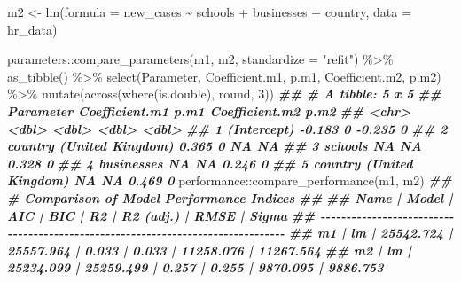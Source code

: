 \documentclass[
]{book}
\newenvironment{Shaded}{\begin{snugshade}}{\end{snugshade}}
\newcommand{\AttributeTok}[1]{\textcolor[rgb]{0.77,0.63,0.00}{#1}}
\newcommand{\DecValTok}[1]{\textcolor[rgb]{0.00,0.00,0.81}{#1}}
\newcommand{\DocumentationTok}[1]{\textcolor[rgb]{0.56,0.35,0.01}{\textbf{\textit{#1}}}}
\newcommand{\FunctionTok}[1]{\textcolor[rgb]{0.00,0.00,0.00}{#1}}
\newcommand{\NormalTok}[1]{#1}
\newcommand{\OtherTok}[1]{\textcolor[rgb]{0.56,0.35,0.01}{#1}}
\newcommand{\SpecialCharTok}[1]{\textcolor[rgb]{0.00,0.00,0.00}{#1}}
\newcommand{\StringTok}[1]{\textcolor[rgb]{0.31,0.60,0.02}{#1}}
\begin{document}
\begin{Shaded}
\begin{Highlighting}[]
\NormalTok{m2 }\OtherTok{\textless{}{-}} \FunctionTok{lm}\NormalTok{(}\AttributeTok{formula =}\NormalTok{ new\_cases }\SpecialCharTok{\textasciitilde{}}
\NormalTok{           schools }\SpecialCharTok{+}
\NormalTok{           businesses }\SpecialCharTok{+}
\NormalTok{           country,}
         \AttributeTok{data =}\NormalTok{ hr\_data)}

\NormalTok{parameters}\SpecialCharTok{::}\FunctionTok{compare\_parameters}\NormalTok{(m1, m2, }\AttributeTok{standardize =} \StringTok{"refit"}\NormalTok{) }\SpecialCharTok{\%\textgreater{}\%}
  \FunctionTok{as\_tibble}\NormalTok{() }\SpecialCharTok{\%\textgreater{}\%}
  \FunctionTok{select}\NormalTok{(Parameter, Coefficient.m1, p.m1, Coefficient.m2, p.m2) }\SpecialCharTok{\%\textgreater{}\%} 
  \FunctionTok{mutate}\NormalTok{(}\FunctionTok{across}\NormalTok{(}\FunctionTok{where}\NormalTok{(is.double), round, }\DecValTok{3}\NormalTok{))}
\DocumentationTok{\#\# \# A tibble: 5 x 5}
\DocumentationTok{\#\#   Parameter                Coefficient.m1  p.m1 Coefficient.m2  p.m2}
\DocumentationTok{\#\#   \textless{}chr\textgreater{}                             \textless{}dbl\textgreater{} \textless{}dbl\textgreater{}          \textless{}dbl\textgreater{} \textless{}dbl\textgreater{}}
\DocumentationTok{\#\# 1 (Intercept)                      {-}0.183     0         {-}0.235     0}
\DocumentationTok{\#\# 2 country (United Kingdom)          0.365     0         NA        NA}
\DocumentationTok{\#\# 3 schools                          NA        NA          0.328     0}
\DocumentationTok{\#\# 4 businesses                       NA        NA          0.246     0}
\DocumentationTok{\#\# 5 country (United Kingdom)         NA        NA          0.469     0}
\NormalTok{performance}\SpecialCharTok{::}\FunctionTok{compare\_performance}\NormalTok{(m1, m2)}
\DocumentationTok{\#\# \# Comparison of Model Performance Indices}
\DocumentationTok{\#\# }
\DocumentationTok{\#\# Name | Model |       AIC |       BIC |    R2 | R2 (adj.) |      RMSE |     Sigma}
\DocumentationTok{\#\# {-}{-}{-}{-}{-}{-}{-}{-}{-}{-}{-}{-}{-}{-}{-}{-}{-}{-}{-}{-}{-}{-}{-}{-}{-}{-}{-}{-}{-}{-}{-}{-}{-}{-}{-}{-}{-}{-}{-}{-}{-}{-}{-}{-}{-}{-}{-}{-}{-}{-}{-}{-}{-}{-}{-}{-}{-}{-}{-}{-}{-}{-}{-}{-}{-}{-}{-}{-}{-}{-}{-}{-}{-}{-}{-}{-}{-}{-}{-}{-}}
\DocumentationTok{\#\# m1   |    lm | 25542.724 | 25557.964 | 0.033 |     0.033 | 11258.076 | 11267.564}
\DocumentationTok{\#\# m2   |    lm | 25234.099 | 25259.499 | 0.257 |     0.255 |  9870.095 |  9886.753}
\end{Highlighting}
\end{Shaded}
\end{document}
